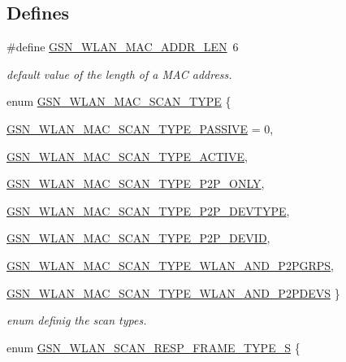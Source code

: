 \subsection*{Defines}
\begin{DoxyCompactItemize}
\item 
\#define \hyperlink{a00641_gab875910eb7b2ccc2d9d632ad20f6564c}{GSN\_\-WLAN\_\-MAC\_\-ADDR\_\-LEN}~6
\begin{DoxyCompactList}\small\item\em default value of the length of a MAC address. \end{DoxyCompactList}\end{DoxyCompactItemize}
\begin{DoxyCompactItemize}
\item 
enum \hyperlink{a00641_ga52dec04a012aa9893ac84e96062c470b}{GSN\_\-WLAN\_\-MAC\_\-SCAN\_\-TYPE} \{ \par
\hyperlink{a00641_gga52dec04a012aa9893ac84e96062c470bae09f79c4995407cd667ad1b5abcc9612}{GSN\_\-WLAN\_\-MAC\_\-SCAN\_\-TYPE\_\-PASSIVE} =  0, 
\par
\hyperlink{a00641_gga52dec04a012aa9893ac84e96062c470ba0a2c019c8d7d286adeef4d155fdd290d}{GSN\_\-WLAN\_\-MAC\_\-SCAN\_\-TYPE\_\-ACTIVE}, 
\par
\hyperlink{a00641_gga52dec04a012aa9893ac84e96062c470bac927d28ebd0a87f1039ffad73c3915af}{GSN\_\-WLAN\_\-MAC\_\-SCAN\_\-TYPE\_\-P2P\_\-ONLY}, 
\par
\hyperlink{a00641_gga52dec04a012aa9893ac84e96062c470bab745f3653e21ca78e739e1a6d353c3cb}{GSN\_\-WLAN\_\-MAC\_\-SCAN\_\-TYPE\_\-P2P\_\-DEVTYPE}, 
\par
\hyperlink{a00641_gga52dec04a012aa9893ac84e96062c470ba8b4ffffa89d273529027dd15468a235a}{GSN\_\-WLAN\_\-MAC\_\-SCAN\_\-TYPE\_\-P2P\_\-DEVID}, 
\par
\hyperlink{a00641_gga52dec04a012aa9893ac84e96062c470ba546c8c8247779348d500fa7251e8e86f}{GSN\_\-WLAN\_\-MAC\_\-SCAN\_\-TYPE\_\-WLAN\_\-AND\_\-P2PGRPS}, 
\par
\hyperlink{a00641_gga52dec04a012aa9893ac84e96062c470ba3257c6240a97ccd25ac86623647bfa7f}{GSN\_\-WLAN\_\-MAC\_\-SCAN\_\-TYPE\_\-WLAN\_\-AND\_\-P2PDEVS}
 \}
\begin{DoxyCompactList}\small\item\em enum definig the scan types. \end{DoxyCompactList}\item 
enum \hyperlink{a00641_ga3f0acfab3987e81164e864f7186c7187}{GSN\_\-WLAN\_\-SCAN\_\-RESP\_\-FRAME\_\-TYPE\_\-S} \{ \par

\end{DoxyCompactItemize}
